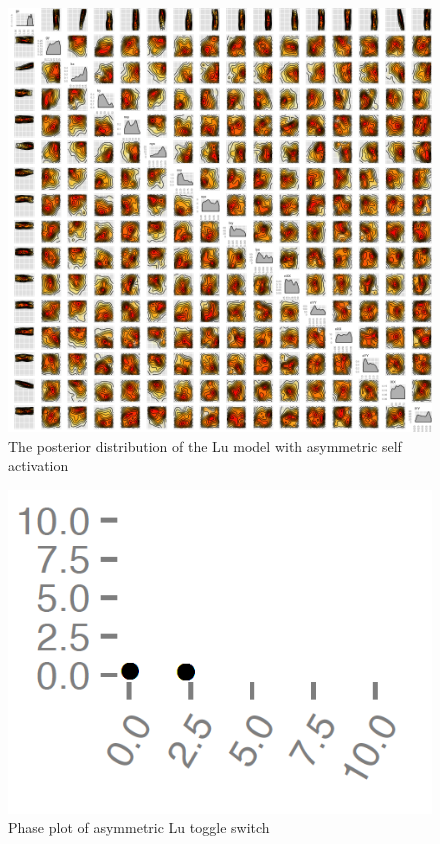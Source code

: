 \begin{figure}[t]
\centering
\includegraphics[scale=0.35]{chapterStabilityFinder/Lu_switches/images/single_pos/posterior_lu_sp_bis.png}
\caption[The posterior distribution of the Lu model with asymmetric self activation]{The posterior distribution of the Lu model with asymmetric self activation}
\label{fig:lu_sp_pos}
\end{figure}

\begin{figure}[t]
\centering
\includegraphics[scale=0.2]{chapterStabilityFinder/Lu_switches/images/single_pos/phase_plot.png}
\caption{Phase plot of asymmetric Lu toggle switch}
\label{fig:lu_sp_phase}
\end{figure}
\clearpage

